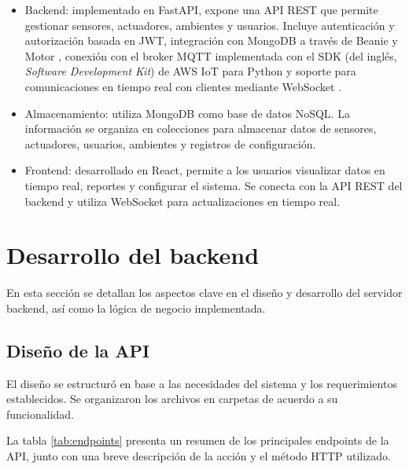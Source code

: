 \begin{itemize}
    \item Backend: implementado en FastAPI, expone una API REST que permite gestionar
          sensores, actuadores, ambientes y usuarios. Incluye autenticación y
          autorización basada en JWT, integración con MongoDB a través de Beanie
          \cite{BeaniODM} y Motor \cite{MotorMongoDB}, conexión con el broker MQTT
          implementada con el SDK (del inglés, \textit{Software Development Kit}) de AWS
          IoT para Python \cite{AWSIoTSDK} y soporte para comunicaciones en tiempo real
          con clientes mediante WebSocket \cite{FastAPIWebSockets}.

    \item Almacenamiento: utiliza MongoDB como base de datos NoSQL. La información se
          organiza en colecciones para almacenar datos de sensores, actuadores, usuarios,
          ambientes y registros de configuración.

    \item Frontend: desarrollado en React, permite a los usuarios visualizar datos en
          tiempo real, reportes y configurar el sistema. Se conecta con la API REST del
          backend y utiliza WebSocket para actualizaciones en tiempo real.
\end{itemize}

\section{Desarrollo del backend}

En esta sección se detallan los aspectos clave en el diseño y desarrollo del
servidor backend, así como la lógica de negocio implementada.

\subsection{Diseño de la API}

El diseño se estructuró en base a las necesidades del sistema y los
requerimientos establecidos. Se organizaron los archivos en carpetas de acuerdo
a su funcionalidad.

La tabla \ref{tab:endpoints} presenta un resumen de los principales endpoints
de la API, junto con una breve descripción de la acción y el método HTTP
utilizado.


